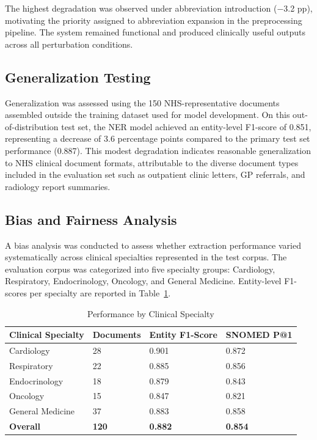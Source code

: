 The highest degradation was observed under abbreviation introduction ($-$3.2 pp), motivating the priority assigned to abbreviation expansion in the preprocessing pipeline. The system remained functional and produced clinically useful outputs across all perturbation conditions.

\subsection{Generalization Testing}
Generalization was assessed using the 150 NHS-representative documents assembled outside the training dataset used for model development. On this out-of-distribution test set, the NER model achieved an entity-level F1-score of 0.851, representing a decrease of 3.6 percentage points compared to the primary test set performance (0.887). This modest degradation indicates reasonable generalization to NHS clinical document formats, attributable to the diverse document types included in the evaluation set such as outpatient clinic letters, GP referrals, and radiology report summaries.

\subsection{Bias and Fairness Analysis}
A bias analysis was conducted to assess whether extraction performance varied systematically across clinical specialties represented in the test corpus. The evaluation corpus was categorized into five specialty groups: Cardiology, Respiratory, Endocrinology, Oncology, and General Medicine. Entity-level F1-scores per specialty are reported in Table~\ref{tab:bias_analysis}.

\begin{table}[htbp]
\centering
\caption{Performance by Clinical Specialty}
\label{tab:bias_analysis}
\begin{tabular}{|p{4cm}|p{2.5cm}|p{3cm}|p{3cm}|}
\hline
\textbf{Clinical Specialty} & \textbf{Documents} & \textbf{Entity F1-Score} & \textbf{SNOMED P@1} \\
\hline
Cardiology & 28 & 0.901 & 0.872 \\
\hline
Respiratory & 22 & 0.885 & 0.856 \\
\hline
Endocrinology & 18 & 0.879 & 0.843 \\
\hline
Oncology & 15 & 0.847 & 0.821 \\
\hline
General Medicine & 37 & 0.883 & 0.858 \\
\hline
\textbf{Overall} & \textbf{120} & \textbf{0.882} & \textbf{0.854} \\
\hline
\end{tabular}
\end{table}


